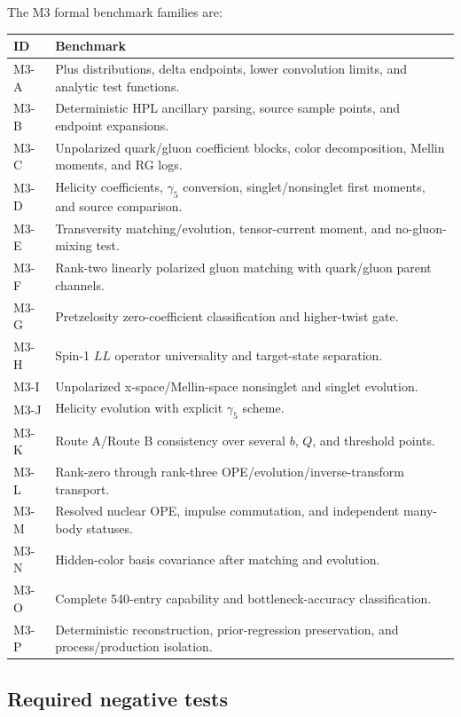 \documentclass[11pt]{article}
\begin{document}
The M3 formal benchmark families are:
\begin{longtable}{L{0.12\textwidth}L{0.80\textwidth}}
\toprule
ID & Benchmark\\
\midrule
\endhead
M3-A & Plus distributions, delta endpoints, lower convolution limits, and analytic test functions.\\
M3-B & Deterministic HPL ancillary parsing, source sample points, and endpoint expansions.\\
M3-C & Unpolarized quark/gluon coefficient blocks, color decomposition, Mellin moments, and RG logs.\\
M3-D & Helicity coefficients, \(\gamma_5\) conversion, singlet/nonsinglet first moments, and source comparison.\\
M3-E & Transversity matching/evolution, tensor-current moment, and no-gluon-mixing test.\\
M3-F & Rank-two linearly polarized gluon matching with quark/gluon parent channels.\\
M3-G & Pretzelosity zero-coefficient classification and higher-twist gate.\\
M3-H & Spin-1 \(LL\) operator universality and target-state separation.\\
M3-I & Unpolarized x-space/Mellin-space nonsinglet and singlet evolution.\\
M3-J & Helicity evolution with explicit \(\gamma_5\) scheme.\\
M3-K & Route A/Route B consistency over several \(b\), \(Q\), and threshold points.\\
M3-L & Rank-zero through rank-three OPE/evolution/inverse-transform transport.\\
M3-M & Resolved nuclear OPE, impulse commutation, and independent many-body statuses.\\
M3-N & Hidden-color basis covariance after matching and evolution.\\
M3-O & Complete 540-entry capability and bottleneck-accuracy classification.\\
M3-P & Deterministic reconstruction, prior-regression preservation, and process/production isolation.\\
\bottomrule
\end{longtable}

\subsection{Required negative tests}
\end{document}
